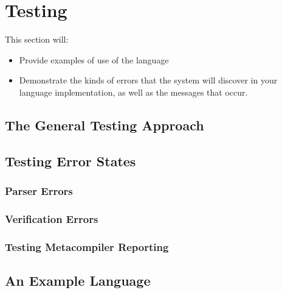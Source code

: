 
\chapter{Testing} %
\label{cha:testing}
This section will:
\begin{itemize}
    \item Provide examples of use of the language
    \item Demonstrate the kinds of errors that the system will discover in your language implementation, as well as the messages that occur. 
\end{itemize}

\section{The General Testing Approach} %
\label{sec:the_general_testing_approach}


\section{Testing Error States} %
\label{sec:testing_error_states}

\subsection{Parser Errors} %
\label{sub:parser_errors}


\subsection{Verification Errors} %
\label{sub:verification_errors}


\subsection{Testing Metacompiler Reporting} %
\label{sub:testing_metacompiler_reporting}



\section{An Example Language} %
\label{sec:an_example_language}


